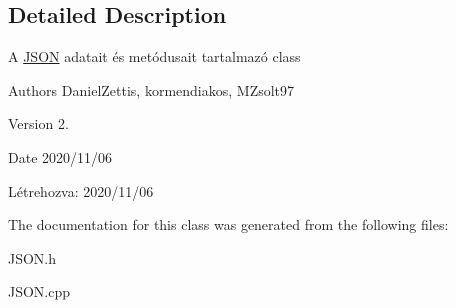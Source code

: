 \subsection{Detailed Description}
A \hyperlink{classJSON}{J\+S\+ON} adatait és metódusait tartalmazó class

\begin{DoxyAuthor}{Authors}
Daniel\+Zettis, kormendiakos, M\+Zsolt97
\end{DoxyAuthor}
\begin{DoxyVersion}{Version}
2.
\end{DoxyVersion}
\begin{DoxyDate}{Date}
2020/11/06
\end{DoxyDate}
Létrehozva\+: 2020/11/06 

The documentation for this class was generated from the following files\+:\begin{DoxyCompactItemize}
\item 
J\+S\+O\+N.\+h\item 
J\+S\+O\+N.\+cpp\end{DoxyCompactItemize}
